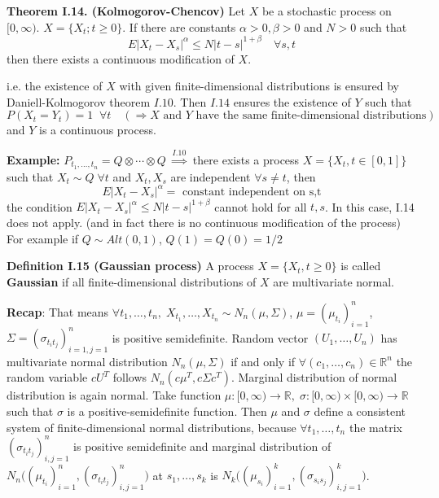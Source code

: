\documentclass[english]{article}
\newcommand{\R}{\mathbb{R}}
\newcommand{\note}[1]{\noindent\textbf{#1}}
\newcommand{\casy}{t_1,\dots, t_n}
\begin{document}
\note{Theorem I.14. (Kolmogorov-Chencov)} Let $X$ be a stochastic process on $[0,\infty)$. $X = \{X_t ; t\geq 0 \}$. If there are constants $\alpha > 0, \beta > 0$ and $N>0$ such that 
$$E|X_t - X_s|^\alpha \leq N|t-s|^{1+\beta}\quad \forall s,t$$
then there exists a continuous modification of $X$.\newline

i.e. the existence of $X$ with given finite-dimensional distributions is ensured by Daniell-Kolmogorov theorem $I.10$. Then $I.14$ ensures the existence of $Y$ such that
$$P(X_t = Y_t) = 1 \;\; \forall t \quad (\Rightarrow X \text{ and } Y \text{ have the same finite-dimensional distributions})$$
and $Y$ is a continuous process.\newline

\note{Example:} $P_{t_1,\dots, t_n} = Q\otimes \cdots \otimes Q \; \stackrel{I.10}\Rightarrow $ there exists a process $X=\{X_t, t\in [0,1]\}$ such that $X_t \sim Q\; \forall t$ and $X_t, X_s$ are independent $\forall s\neq t$, then
$$E|X_t - X_s|^\alpha = \text{ constant independent on s,t}$$
the condition $E|X_t - X_s|^\alpha \leq N|t-s|^{1+\beta}$ cannot hold for all $t,s$. In this case, I.14 does not apply. (and in fact there is no continuous modification of the process) \newline 
For example if $Q\sim Alt(0,1)$, $Q(1)=Q(0) = 1/2$ \newline

\note{Definition I.15 (Gaussian process)} A process $X=\{X_t, t\geq 0 \}$ is called \textbf{Gaussian} if all finite-dimensional distributions of $X$ are multivariate normal.\newline

\note{Recap}: That means $\forall t_1,\dots, t_n,\; X_{t_1},\dots, X_{t_n} \sim N_n (\mu, \Sigma)$, $\mu=(\mu_{t_i})^n_{i=1}$, $\Sigma = (\sigma_{t_i t_j})^n _{i=1, j=1}$ is positive semidefinite. \newline
Random vector $(U_1, \dots, U_n)$ has multivariate normal distribution $N_n(\mu, \Sigma)$ if and only if $\forall (c_1,\dots, c_n)\in \R^n$ the random variable $cU^T$ follows $N_n(c\mu^T, c \Sigma c^T)$. \newline
Marginal distribution of normal distribution is again normal. \newline
Take function $\mu: [0,\infty) \to \R,\; \sigma: [0,\infty)\times [0,\infty) \to \R$ such that $\sigma$ is a positive-semidefinite function. Then $\mu$ and $\sigma$ define a consistent system of finite-dimensional normal distributions, because $\forall\casy$ the matrix $(\sigma_{t_i t_j})^n_{i,j=1}$ is positive semidefinite and marginal distribution of $N_n \Big((\mu_{t_i})^n_{i=1}, (\sigma_{t_i t_j})^n_{i,j=1} \Big)$ at $s_1, \dots, s_k$ is $N_k\Big((\mu_{s_i})^k_{i=1}, (\sigma_{s_i s_j})^k_{i,j=1}\Big)$.
\end{document}
